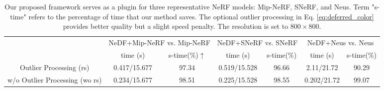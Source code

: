 \documentclass[letterpaper]{article} %
\begin{document}
\begin{table}[htbp]
\begin{center}
\begin{tabular}{c|cc|cc|cc}
\hline
 & \multicolumn{2}{c|}{NeDF+Mip-NeRF vs. Mip-NeRF } & \multicolumn{2}{c|}{NeDF+SNeRF vs. SNeRF} & \multicolumn{2}{c}{NeDF+Neus vs. Neus} \\ \cline{2-7} 
 & time (s)   & s-time(\%)$\uparrow$   & time (s)   & s-time(\%)    &  time (s)  & s-time(\%)   \\ \hline
Outlier Processing (rs)    &0.417/15.677  & 97.34 & 0.519/15.528 & 96.66 & 2.11/21.72  & 90.29 \\
w/o Outlier Processing (wo rs) &0.234/15.677  & 98.51 & 0.225/15.528  & 98.55 & 0.202/21.72  & 99.07 \\ \hline
\end{tabular}
\caption{Our proposed framework serves as a plugin for three representative NeRF models: Mip-NeRF, SNeRF, and Neus. Term "s-time" refers to the percentage of time that our method saves. The optional outlier processing in Eq. \ref{eq:deferred_color} provides better quality but a slight speed penalty. The resolution is set to $800\times800$.} 
\label{tab:3based}
\end{center}
\end{table}

\end{document}
